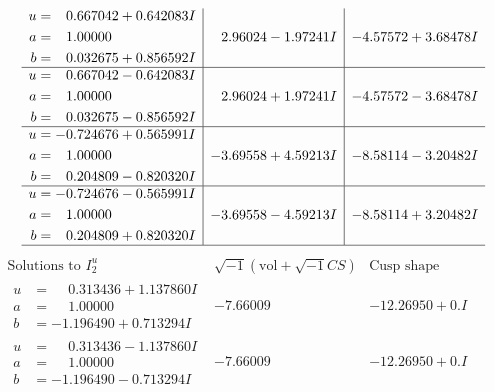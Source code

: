 \documentclass[1p]{elsarticle_modified}
\theoremstyle{definition}
\newcommand{\I}{\sqrt{-1}}
\begin{document}
$$\begin{array}{c|c|c}
\begin{aligned}
u &= \phantom{-}0.667042 + 0.642083 I \\
a &= \phantom{-}1.00000\phantom{ +0.000000I} \\
b &= \phantom{-}0.032675 + 0.856592 I\end{aligned}
 & \phantom{-}2.96024 - 1.97241 I & -4.57572 + 3.68478 I \\ \hline\begin{aligned}
u &= \phantom{-}0.667042 - 0.642083 I \\
a &= \phantom{-}1.00000\phantom{ +0.000000I} \\
b &= \phantom{-}0.032675 - 0.856592 I\end{aligned}
 & \phantom{-}2.96024 + 1.97241 I & -4.57572 - 3.68478 I \\ \hline\begin{aligned}
u &= -0.724676 + 0.565991 I \\
a &= \phantom{-}1.00000\phantom{ +0.000000I} \\
b &= \phantom{-}0.204809 - 0.820320 I\end{aligned}
 & -3.69558 + 4.59213 I & -8.58114 - 3.20482 I \\ \hline\begin{aligned}
u &= -0.724676 - 0.565991 I \\
a &= \phantom{-}1.00000\phantom{ +0.000000I} \\
b &= \phantom{-}0.204809 + 0.820320 I\end{aligned}
 & -3.69558 - 4.59213 I & -8.58114 + 3.20482 I\\
 \hline 
 \end{array}$$\newpage$$\begin{array}{c|c|c}  
\text{Solutions to }I^u_{2}& \I (\text{vol} + \sqrt{-1}CS) & \text{Cusp shape}\\
 \hline 
\begin{aligned}
u &= \phantom{-}0.313436 + 1.137860 I \\
a &= \phantom{-}1.00000\phantom{ +0.000000I} \\
b &= -1.196490 + 0.713294 I\end{aligned}
 & -7.66009\phantom{ +0.000000I} & -12.26950 + 0. I\phantom{ +0.000000I} \\ \hline\begin{aligned}
u &= \phantom{-}0.313436 - 1.137860 I \\
a &= \phantom{-}1.00000\phantom{ +0.000000I} \\
b &= -1.196490 - 0.713294 I\end{aligned}
 & -7.66009\phantom{ +0.000000I} & -12.26950 + 0. I\phantom{ +0.000000I} \\ \hline\begin{aligned}

\end{aligned}
\end{array}$$
\end{document}
